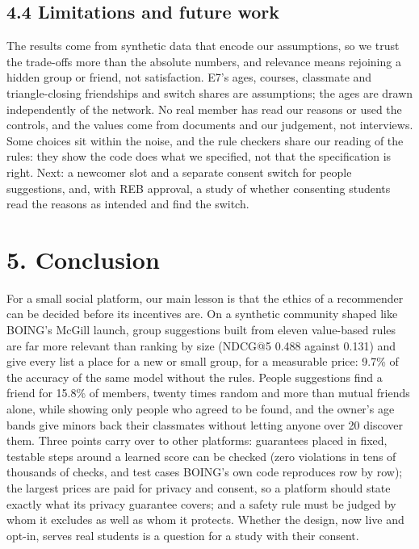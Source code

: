 \documentclass[11pt,letterpaper]{article}
\begin{document}
\subsection{4.4 Limitations and future work}

The results come from synthetic data that encode our assumptions, so we trust the trade-offs more than the
absolute numbers, and relevance means rejoining a hidden group or friend, not satisfaction. E7's ages,
courses, classmate and triangle-closing friendships and switch shares are assumptions; the ages are drawn
independently of the network. No real member has read our reasons or used the controls, and the values come
from documents and our judgement, not interviews. Some choices sit within the noise, and the rule checkers
share our reading of the rules: they show the code does what we specified, not that the specification is
right. Next: a newcomer slot and a separate consent switch for people suggestions, and, with REB approval, a
study of whether consenting students read the reasons as intended and find the switch.

\section{5. Conclusion}

For a small social platform, our main lesson is that the ethics of a recommender can be decided before its
incentives are. On a synthetic community shaped like BOING's McGill launch, group suggestions built from
eleven value-based rules are far more relevant than ranking by size (NDCG@5 0.488 against 0.131) and give
every list a place for a new or small group, for a measurable price: 9.7\% of the accuracy of the same model
without the rules. People suggestions find a friend for 15.8\% of members, twenty times random and more than
mutual friends alone, while showing only people who agreed to be found, and the owner's age bands give minors
back their classmates without letting anyone over 20 discover them. Three points carry over to other
platforms: guarantees placed in fixed, testable steps around a learned score can be checked (zero violations
in tens of thousands of checks, and test cases BOING's own code reproduces row by row); the largest prices are
paid for privacy and consent, so a platform should state exactly what its privacy guarantee covers; and a
safety rule must be judged by whom it excludes as well as whom it protects. Whether the design, now live and
opt-in, serves real students is a question for a study with their consent.
\end{document}
